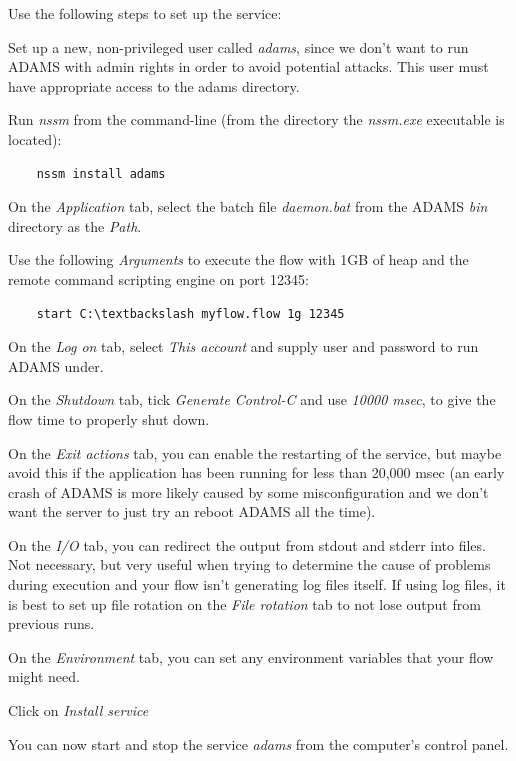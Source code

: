 \noindent Use the following steps to set up the service:
\begin{tight_itemize}
  \item Set up a new, non-privileged user called \textit{adams}, since we
  don't want to run ADAMS with admin rights in order to avoid potential attacks.
  This user must have appropriate access to the adams directory.
  \item Run \textit{nssm} from the command-line (from the directory the
  \textit{nssm.exe} executable is located):
    \begin{verbatim}
    nssm install adams
    \end{verbatim}
  \item On the \textit{Application} tab, select the batch file \textit{daemon.bat}
  from the ADAMS \textit{bin} directory as the \textit{Path}.
  \item Use the following \textit{Arguments} to execute the flow with 1GB of
  heap and the remote command scripting engine on port 12345:
    \begin{verbatim}
    start C:\textbackslash myflow.flow 1g 12345
    \end{verbatim}
  \item On the \textit{Log on} tab, select \textit{This account} and supply user
  and password to run ADAMS under.
  \item On the \textit{Shutdown} tab, tick \textit{Generate Control-C} and use
  \textit{10000 msec}, to give the flow time to properly shut down.
  \item On the \textit{Exit actions} tab, you can enable the restarting of the
  service, but maybe avoid this if the application has been running for less
  than 20,000 msec (an early crash of ADAMS is more likely caused by some
  misconfiguration and we don't want the server to just try an reboot ADAMS all
  the time).
  \item On the \textit{I/O} tab, you can redirect the output from stdout and
  stderr into files. Not necessary, but very useful when trying to determine
  the cause of problems during execution and your flow isn't generating log
  files itself. If using log files, it is best to set up file rotation on the
  \textit{File rotation} tab to not lose output from previous runs.
  \item On the \textit{Environment} tab, you can set any environment variables
  that your flow might need.
  \item Click on \textit{Install service}
\end{tight_itemize}
You can now start and stop the service \textit{adams} from the computer's
control panel.

